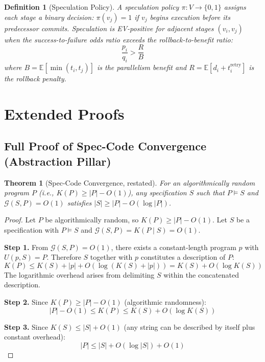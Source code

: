 \documentclass[11pt, a4paper]{googledeepmind}
\newcommand{\E}{\mathbb{E}}
\newtheorem{definition}{Definition}[section]
\newtheorem{theorem}{Theorem}[section]
\begin{document}
\begin{appendices}
\begin{definition}[Speculation Policy]
\label{def:ext-speculation}
A \emph{speculation policy} $\pi: V \to \{0,1\}$ assigns each stage a binary
decision: $\pi(v_j) = 1$ if $v_j$ begins execution before its predecessor commits.
Speculation is EV-positive for adjacent stages $(v_i, v_j)$ when the success-to-failure
odds ratio exceeds the rollback-to-benefit ratio:
\[
  \frac{p_i}{q_i} > \frac{R}{B}
\]
where $B = \E[\min(t_i, t_j)]$ is the parallelism benefit and
$R = \E[d_i + t_i^{\mathrm{retry}}]$ is the rollback penalty.
\end{definition}



\section{Extended Proofs}
\label{app:proofs-extended}

\subsection{Full Proof of Spec-Code Convergence (Abstraction Pillar)}

\begin{theorem}[Spec-Code Convergence, restated]
For an algorithmically random program $P$ (i.e., $K(P) \geq |P| - O(1)$),
any specification $S$ such that $P \models S$ and
$\mathcal{G}(S, P) = O(1)$ satisfies $|S| \geq |P| - O(\log |P|)$.
\end{theorem}

\begin{proof}
Let $P$ be algorithmically random, so $K(P) \geq |P| - O(1)$.
Let $S$ be a specification with $P \models S$ and $\mathcal{G}(S, P) = K(P \mid S) = O(1)$.

\textbf{Step 1.} From $\mathcal{G}(S, P) = O(1)$, there exists a constant-length
program $p$ with $U(p, S) = P$. Therefore $S$ together with $p$ constitutes a
description of $P$:
\[
  K(P) \leq K(S) + |p| + O(\log(K(S) + |p|)) = K(S) + O(\log K(S))
\]
The logarithmic overhead arises from delimiting $S$ within the concatenated description.

\textbf{Step 2.} Since $K(P) \geq |P| - O(1)$ (algorithmic randomness):
\[
  |P| - O(1) \leq K(P) \leq K(S) + O(\log K(S))
\]

\textbf{Step 3.} Since $K(S) \leq |S| + O(1)$ (any string can be described by
itself plus constant overhead):
\[
  |P| \leq |S| + O(\log |S|) + O(1)
\]


\end{proof}
\end{appendices}
\end{document}
